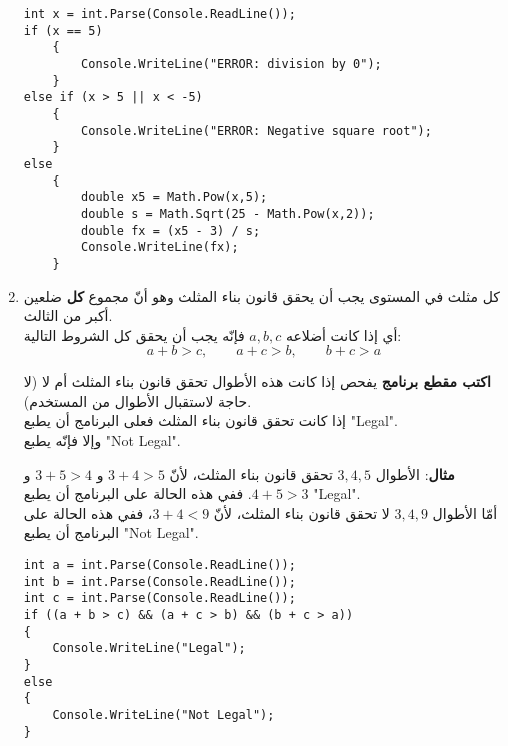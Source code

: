\documentclass[14pt]{extarticle}
\begin{document}
\begin{enumerate}[itemsep=3em]
\ifwithsols
\begin{boxSolution}
\begin{english}
\begin{verbatim}
int x = int.Parse(Console.ReadLine());
if (x == 5)
    {
        Console.WriteLine("ERROR: division by 0");
    }
else if (x > 5 || x < -5)
    {
        Console.WriteLine("ERROR: Negative square root");
    }
else
    {
        double x5 = Math.Pow(x,5);
        double s = Math.Sqrt(25 - Math.Pow(x,2));
        double fx = (x5 - 3) / s;
        Console.WriteLine(fx);
    }
\end{verbatim}
\end{english}
\end{boxSolution}
\fi

\clearpage
\item
كل مثلث في المستوى يجب أن يحقق قانون بناء المثلث وهو أنّ مجموع \textbf{كل} ضلعين أكبر من الثالث. \\
 أي إذا كانت أضلاعه $a, b, c$ فإنّه يجب أن يحقق كل الشروط التالية:
\[ a + b > c ,  \qquad a + c > b ,  \qquad b + c > a \]

\textbf{اكتب مقطع برنامج} يفحص إذا كانت هذه الأطوال تحقق قانون بناء المثلث أم لا (لا حاجة لاستقبال الأطوال من المستخدم). \\
إذا كانت تحقق قانون بناء المثلث فعلى البرنامج أن يطبع \textenglish{"Legal"}. \\
وإلا فإنّه يطبع \textenglish{"Not Legal"}.

\textbf{مثال}: الأطوال $3, 4, 5$ تحقق قانون بناء المثلث، لأنّ $3 + 4 > 5$ و $3 + 5 > 4$ و $4 + 5 > 3$. ففي هذه الحالة على البرنامج أن يطبع \textenglish{"Legal"}. \\
أمّا الأطوال $3, 4, 9$ لا تحقق قانون بناء المثلث، لأنّ $3 + 4 < 9$، ففي هذه الحالة على البرنامج أن يطبع \textenglish{"Not Legal"}.

\ifwithsols
\begin{boxSolution}
\begin{english}
\begin{verbatim}
int a = int.Parse(Console.ReadLine());
int b = int.Parse(Console.ReadLine());
int c = int.Parse(Console.ReadLine());
if ((a + b > c) && (a + c > b) && (b + c > a))
{
    Console.WriteLine("Legal");
}
else
{
    Console.WriteLine("Not Legal");
}
\end{verbatim}
\end{english}
\end{boxSolution}
\fi


\end{enumerate}
\end{document}
